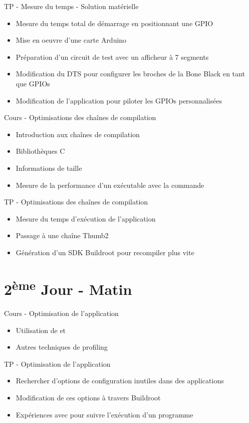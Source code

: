 \documentclass[a4paper,12pt,obeyspaces,spaces,hyphens]{article}
\begin{document}
\feagendatwocolumn
{TP - Mesure du temps - Solution matérielle}
{
  \begin{itemize}
  \item Mesure du temps total de démarrage en positionnant une GPIO
  \item Mise en oeuvre d'une carte Arduino
  \item Préparation d'un circuit de test avec un afficheur à 7 segments
  \item Modification du DTS pour configurer les broches de la Bone Black en tant que GPIOs
  \item Modification de l'application pour piloter les GPIOs personnalisées
  \end{itemize}
}
{Cours - Optimisations des chaînes de compilation}
{
  \begin{itemize}
  \item Introduction aux chaînes de compilation
  \item Bibliothèques C
  \item Informations de taille
  \item Mesure de la performance d'un exécutable avec la commande 
  \end{itemize}
}

\feagendaonecolumn
{TP - Optimisations des chaînes de compilation}
{
  \begin{itemize}
  \item Mesure du temps d'exécution de l'application
  \item Passage à une chaîne Thumb2
  \item Génération d'un SDK Buildroot pour recompiler plus vite
  \end{itemize}
}

\section{2\textsuperscript{ème} Jour - Matin}

\feagendatwocolumn
{Cours - Optimisation de l'application}
{
  \begin{itemize}
  \item Utilisation de  et 
  \item Autres techniques de profiling
  \end{itemize}
}
{TP - Optimisation de l'application}
{
 \begin{itemize}
 \item Rechercher d'options de configuration inutiles dans des applications
 \item Modification de ces options à travers Buildroot
 \item Expériences avec  pour suivre l'exécution d'un programme
 \end{itemize}
}
\end{document}

